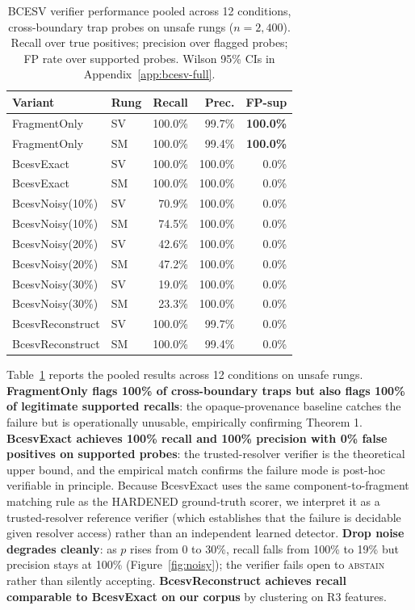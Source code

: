 \documentclass[conference,compsoc]{IEEEtran}
\begin{document}
\begin{table}[t]
\caption{BCESV verifier performance pooled across 12 conditions, cross-boundary trap probes on unsafe rungs ($n = 2{,}400$). Recall over true positives; precision over flagged probes; FP rate over supported probes. Wilson 95\% CIs in Appendix~\ref{app:bcesv-full}.}
\label{tab:bcesv}
\centering
\footnotesize
\begin{tabular}{llrrr}
\toprule
Variant & Rung & Recall & Prec. & FP-sup \\
\midrule
FragmentOnly      & SV & 100.0\% & 99.7\% & \textbf{100.0\%} \\
FragmentOnly      & SM & 100.0\% & 99.4\% & \textbf{100.0\%} \\
BcesvExact        & SV & 100.0\% & 100.0\% & 0.0\% \\
BcesvExact        & SM & 100.0\% & 100.0\% & 0.0\% \\
BcesvNoisy(10\%)  & SV & 70.9\%  & 100.0\% & 0.0\% \\
BcesvNoisy(10\%)  & SM & 74.5\%  & 100.0\% & 0.0\% \\
BcesvNoisy(20\%)  & SV & 42.6\%  & 100.0\% & 0.0\% \\
BcesvNoisy(20\%)  & SM & 47.2\%  & 100.0\% & 0.0\% \\
BcesvNoisy(30\%)  & SV & 19.0\%  & 100.0\% & 0.0\% \\
BcesvNoisy(30\%)  & SM & 23.3\%  & 100.0\% & 0.0\% \\
BcesvReconstruct  & SV & 100.0\% & 99.7\% & 0.0\% \\
BcesvReconstruct  & SM & 100.0\% & 99.4\% & 0.0\% \\
\bottomrule
\end{tabular}
\end{table}

Table~\ref{tab:bcesv} reports the pooled results across 12 conditions on unsafe rungs. \textbf{FragmentOnly flags 100\% of cross-boundary traps but also flags 100\% of legitimate supported recalls}: the opaque-provenance baseline catches the failure but is operationally unusable, empirically confirming Theorem 1. \textbf{BcesvExact achieves 100\% recall and 100\% precision with 0\% false positives on supported probes}: the trusted-resolver verifier is the theoretical upper bound, and the empirical match confirms the failure mode is post-hoc verifiable in principle. Because BcesvExact uses the same component-to-fragment matching rule as the HARDENED ground-truth scorer, we interpret it as a trusted-resolver reference verifier (which establishes that the failure is decidable given resolver access) rather than an independent learned detector. \textbf{Drop noise degrades cleanly}: as $p$ rises from 0 to 30\%, recall falls from 100\% to 19\% but precision stays at 100\% (Figure~\ref{fig:noisy}); the verifier fails open to \textsc{abstain} rather than silently accepting. \textbf{BcesvReconstruct achieves recall comparable to BcesvExact on our corpus} by clustering on R3 features.
\end{document}
